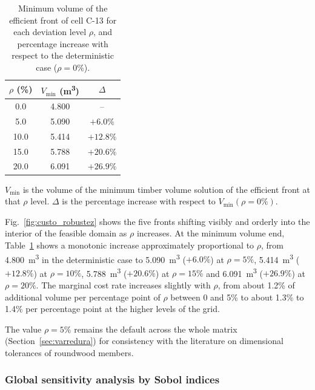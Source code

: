 \begin{table}[!ht]
\caption{Minimum volume of the efficient front of cell C-13 for each deviation level $\rho$, and percentage increase with respect to the deterministic case ($\rho = 0\%$).\label{tab:custo_robustez}}
\begin{threeparttable}
\begin{tabular*}{\columnwidth}{@{\extracolsep\fill}ccc@{\extracolsep\fill}}
\toprule
$\rho$ (\%) & $V_{\min}$ (m\textsuperscript{3}) & $\Delta$ \\
\midrule
0.0 & 4.800 & -- \\
5.0 & 5.090 & $+6.0\%$ \\
10.0 & 5.414 & $+12.8\%$ \\
15.0 & 5.788 & $+20.6\%$ \\
20.0 & 6.091 & $+26.9\%$ \\
\bottomrule
\end{tabular*}
\begin{tablenotes}
\footnotesize
\item $V_{\min}$ is the volume of the minimum timber volume solution of the efficient front at that $\rho$ level. $\Delta$ is the percentage increase with respect to $V_{\min}(\rho{=}0\%)$.
\end{tablenotes}
\end{threeparttable}
\end{table}

Fig.~\ref{fig:custo_robustez} shows the five fronts shifting visibly and orderly into the interior of the feasible domain as $\rho$ increases.
At the minimum volume end, Table~\ref{tab:custo_robustez} shows a monotonic increase approximately proportional to $\rho$, from 4.800~m\textsuperscript{3} in the deterministic case to 5.090~m\textsuperscript{3} ($+6.0\%$) at $\rho = 5\%$, 5.414~m\textsuperscript{3} ($+12.8\%$) at $\rho = 10\%$, 5.788~m\textsuperscript{3} ($+20.6\%$) at $\rho = 15\%$ and 6.091~m\textsuperscript{3} ($+26.9\%$) at $\rho = 20\%$.
The marginal cost rate increases slightly with $\rho$, from about 1.2\% of additional volume per percentage point of $\rho$ between 0 and 5\% to about 1.3\% to 1.4\% per percentage point at the higher levels of the grid.

The value $\rho = 5\%$ remains the default across the whole matrix (Section~\ref{sec:varredura}) for consistency with the literature on dimensional tolerances of roundwood members.

\subsubsection{Global sensitivity analysis by Sobol indices}\label{sec:sobol}

